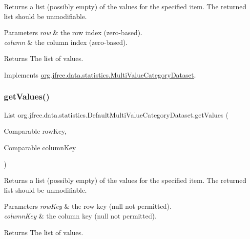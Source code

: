 Returns a list (possibly empty) of the values for the specified item. The returned list should be unmodifiable.


\begin{DoxyParams}{Parameters}
{\em row} & the row index (zero-\/based). \\
\hline
{\em column} & the column index (zero-\/based).\\
\hline
\end{DoxyParams}
\begin{DoxyReturn}{Returns}
The list of values. 
\end{DoxyReturn}


Implements \mbox{\hyperlink{interfaceorg_1_1jfree_1_1data_1_1statistics_1_1_multi_value_category_dataset_ad84c58a61b652cdb78a8ed459510fb74}{org.\+jfree.\+data.\+statistics.\+Multi\+Value\+Category\+Dataset}}.

\mbox{\label{classorg_1_1jfree_1_1data_1_1statistics_1_1_default_multi_value_category_dataset_aeb92fa85eb9b8f780c0b62500989ed22}} 
\subsubsection{\texorpdfstring{get\+Values()}{getValues()}\hspace{0.1cm}{\footnotesize\ttfamily [2/2]}}
{\footnotesize\ttfamily List org.\+jfree.\+data.\+statistics.\+Default\+Multi\+Value\+Category\+Dataset.\+get\+Values (\begin{DoxyParamCaption}\item[{Comparable}]{row\+Key,  }\item[{Comparable}]{column\+Key }\end{DoxyParamCaption})}

Returns a list (possibly empty) of the values for the specified item. The returned list should be unmodifiable.


\begin{DoxyParams}{Parameters}
{\em row\+Key} & the row key ({\ttfamily null} not permitted). \\
\hline
{\em column\+Key} & the column key ({\ttfamily null} not permitted).\\
\hline
\end{DoxyParams}
\begin{DoxyReturn}{Returns}
The list of values. 
\end{DoxyReturn}


